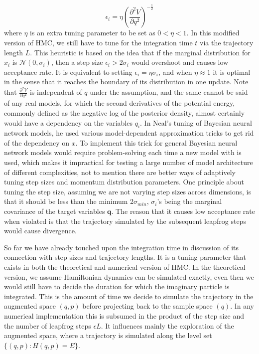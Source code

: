 \documentclass[12pt]{report}
\begin{document}
\[ \epsilon_i  = \eta (\frac{\partial^2 V}{\partial q^2})^{-\frac{1}{2}}\]
where $\eta$ is an extra tuning parameter to be set as $0<\eta<1$. In this
modified version of HMC, we still have to tune for the integration time $t$ via
the trajectory length $L$. This heuristic is based on the idea that if the
marginal distribution for $x_i$ is $\mathcal{N}(0,\sigma_i)$, then a
step size $\epsilon_i > 2 \sigma_i$ would overshoot and causes low acceptance
rate. It is equivalent to setting $\epsilon_i = \eta \sigma_i$, and when $\eta
\approx 1$ it is optimal in the sense that it reaches the boundary of its
distribution in one update. Note that $  \frac{\partial^2 V}{\partial q^2}$ is
independent of $q$ under the assumption, and the same cannot be said of any real
models, for which the second derivatives of the potential energy, commonly
defined as the negative log of the posterior density, almost certainly would
have a dependency on the variables $q_i$. In Neal's tuning of Bayesian neural network models, he used
various model-dependent approximation tricks to get rid of the dependency on
$x$. To implement this trick for general Bayesian neural network models would require
problem-solving each time a new model with is used, which makes it impractical for
testing a large number of model architecture of different complexities, not to mention there are better ways of adaptively tuning
step sizes and momentum distribution parameters. One principle about tuning
the step size, assuming we are not varying step sizes across dimensions, is that it
should be less than the minimum 2$\sigma_{min}$, $\sigma_i$'s being the marginal
covariance of the target variables $\mathbf{q}$. The reason that it causes low
acceptance rate when violated is that the trajectory simulated by the subsequent
leapfrog steps would cause divergence. 


So far we have already touched upon the integration time in discussion of
its connection with step sizes and trajectory lengths. It is a tuning parameter
that exists in both the theoretical and numerical version of HMC. In the
theoretical version, we assume Hamiltonian dynamics can be simulated exactly,
even then we would still have to decide the duration for which the imaginary
particle is integrated. This
is the amount of time we decide to simulate the trajectory in the augmented
space $(q,p)$ before projecting back to the sample space $(q)$. In any
numerical implementation this is subsumed in the product of the step size and the
number of leapfrog steps $\epsilon L$. It influences mainly the exploration of
the augmented space, where a trajectory is simulated along the level set
$\{(q,p):H(q,p)=E\}$.
\end{document}
